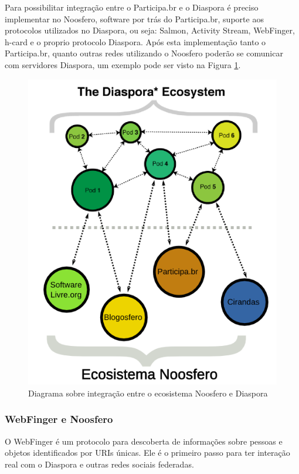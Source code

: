 \documentclass[12pt]{article}
\begin{document}
Para possibilitar integração entre o Participa.br e o Diaspora é preciso
implementar no Noosfero, software por trás do Participa.br, suporte aos
protocolos utilizados no Diaspora, ou seja: Salmon, Activity
Stream, WebFinger, h-card e o proprio protocolo Diaspora. Após esta
implementação tanto o Participa.br, quanto outras redes utilizando o Noosfero
poderão se comunicar com servidores Diaspora, um exemplo pode ser visto na
Figura \ref{ecosistema}.

\begin{figure}[h]
\center
\includegraphics[scale=0.4]{ecosistema-noosfero-diaspora.png}
\caption{Diagrama sobre integração entre o ecosistema Noosfero e Diaspora}
\label{ecosistema}
\end{figure}

\subsubsection{WebFinger e Noosfero}

O WebFinger é um protocolo para descoberta de informações sobre pessoas e
objetos identificados por URIs únicas. Ele é o primeiro passo para ter
interação real com o Diaspora e outras redes sociais federadas.
\end{document}
